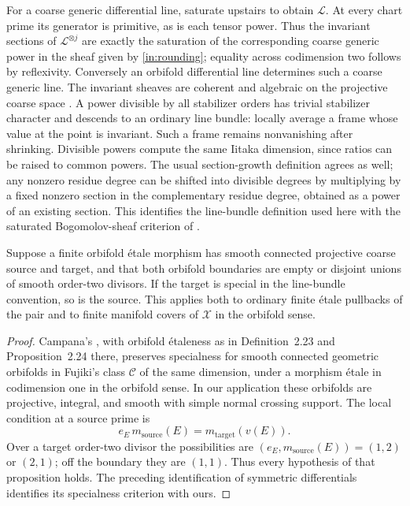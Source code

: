 For a coarse generic differential line, saturate upstairs to obtain
\(\mathcal L\).  At every chart prime its generator is primitive,
as is each tensor power.  Thus the invariant sections of
\(\mathcal L^{\otimes j}\) are exactly the saturation of the
corresponding coarse generic power in the sheaf given by
\eqref{in:rounding}; equality across codimension two follows by
reflexivity.  Conversely an orbifold differential line determines
such a coarse generic line.  The invariant sheaves are coherent and
algebraic on the projective coarse space \cite{GAGA}.  A power
divisible by all stabilizer orders has trivial stabilizer character
and descends to an ordinary line bundle: locally average a frame
whose value at the point is invariant.  Such a frame remains
nonvanishing after shrinking.  Divisible powers compute the same
Iitaka dimension, since ratios can be raised to common powers.
The usual section-growth definition agrees as well; any nonzero
residue degree can be shifted into divisible degrees by multiplying
by a fixed nonzero section in the complementary residue degree,
obtained as a power of an existing section.  This identifies the
line-bundle definition used here with the saturated Bogomolov-sheaf
criterion of \cite[Theorems~4.14--4.15]{CampanaSurvey}.

\begin{proposition}\label{in:finite-stability}
Suppose a finite orbifold \'{e}tale morphism has smooth connected
projective coarse source and target, and that both orbifold
boundaries are empty or disjoint unions of smooth order-two
divisors.  If the target is special in the line-bundle convention,
so is the source.  This applies both to ordinary finite \'{e}tale
pullbacks of the pair and to finite manifold covers of
\(\mathcal X\) in the orbifold sense.
\end{proposition}

\begin{proof}
Campana's \cite[Proposition~9.11]{CampanaOrbifolds}, with orbifold
\'{e}taleness as in Definition~2.23 and Proposition~2.24 there,
preserves specialness for smooth connected geometric orbifolds in
Fujiki's class \(\mathcal C\) of the same dimension, under a
morphism \'{e}tale in codimension one in the orbifold sense.  In our
application these orbifolds are projective, integral, and smooth
with simple normal crossing support.  The local condition at a
source prime is
\[
 e_E\,m_{\mathrm{source}}(E)
       =m_{\mathrm{target}}(v(E)).
\]
Over a target order-two divisor the possibilities are
\((e_E,m_{\mathrm{source}}(E))=(1,2)\) or \((2,1)\);
off the boundary they are \((1,1)\).  Thus every hypothesis of that
proposition holds.  The preceding identification of symmetric
differentials identifies its specialness criterion with ours.
\end{proof}

